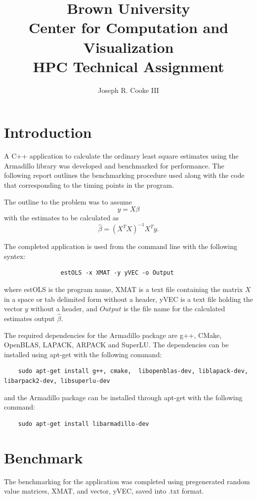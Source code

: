 \documentclass{article}
\title{Brown University \\
	Center for Computation and Visualization \\
	HPC Technical Assignment}
\author{Joseph R. Cooke III}
\begin{document}
\maketitle

\newpage

\section{Introduction}
A C++ application to calculate the ordinary least square estimates using the Armadillo library was developed and benchmarked for performance. The following report outlines the benchmarking procedure used along with the code that corresponding to the timing points in the program. 

The outline to the problem was to assume
\begin{equation}
	y = X\beta
\end{equation}
with the estimates to be calculated as
\begin{equation}
	\hat{\beta} = (X^{T}X)^{-1}X^{T}y.
\end{equation}

The completed application is used from the command line with the following syntex:
\begin{lstlisting}
				estOLS -x XMAT -y yVEC -o Output
\end{lstlisting}
where estOLS is the program name, XMAT is a text file containing the matrix $X$ in a space or tab delimited form without a header, yVEC is a text file holding the vector $y$ without a header, and $Output$ is the file name for the calculated estimates output $\hat{\beta}$.

The required dependencies for the Armadillo package are g++, CMake, OpenBLAS, LAPACK, ARPACK and SuperLU. The dependencies can be installed using apt-get with the following command:

\begin{lstlisting}
	sudo apt-get install g++, cmake,  libopenblas-dev, liblapack-dev, libarpack2-dev, libsuperlu-dev
\end{lstlisting}

and the Armadillo package can be installed through apt-get with the following command:

\begin{lstlisting}
	sudo apt-get install libarmadillo-dev
\end{lstlisting}

\section{Benchmark}
The benchmarking for the application was completed using pregenerated random value matrices, XMAT, and vector, yVEC, saved into .txt format. 
\end{document}
